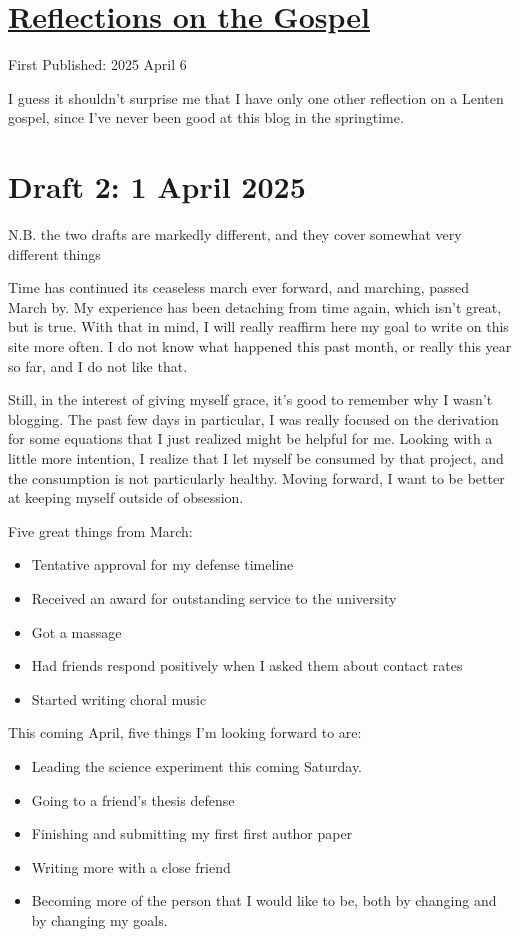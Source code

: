 \documentclass[12pt]{article}[titlepage]
\renewcommand{\,}{\textsuperscript{,}}
\begin{document}
\doublespacing
\section{\href{reflections-on-readings-5-lent-c-25.html}{Reflections on the Gospel}}
First Published: 2025 April 6

I guess it shouldn't surprise me that I have only one other reflection on a Lenten gospel, since I've never been good at this blog in the springtime.
\section{Draft 2: 1 April 2025}

N.B. the two drafts are markedly different, and they cover somewhat very different things

Time has continued its ceaseless march ever forward, and marching, passed March by.  
My experience has been detaching from time again, which isn't great, but is true.  
With that in mind, I will really reaffirm here my goal to write on this site more often.  
I do not know what happened this past month, or really this year so far, and I do not like that.

Still, in the interest of giving myself grace, it's good to remember why I wasn't blogging.  
The past few days in particular, I was really focused on the derivation for some equations that I just realized might be helpful for me.  
Looking with a little more intention, I realize that I let myself be consumed by that project, and the consumption is not particularly healthy.  
Moving forward, I want to be better at keeping myself outside of obsession.

Five great things from March:  
\begin{itemize}  
\item Tentative approval for my defense timeline  
\item Received an award for outstanding service to the university  
\item Got a massage  
\item Had friends respond positively when I asked them about contact rates  
\item Started writing choral music  
\end{itemize}

This coming April, five things I'm looking forward to are:  
\begin{itemize}  
\item Leading the science experiment this coming Saturday.  
\item Going to a friend's thesis defense  
\item Finishing and submitting my first first author paper  
\item Writing more with a close friend  
\item Becoming more of the person that I would like to be, both by changing and by changing my goals.  
\end{itemize}
\end{document}
